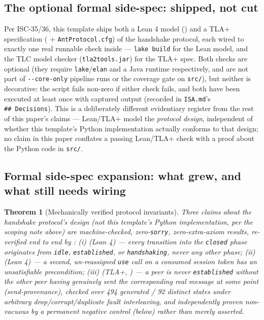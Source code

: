 \documentclass[
  english,
]{article}
\newtheorem{theorem}{Theorem}
\theoremstyle{definition}
\begin{document}
\subsection{The optional formal side-spec: shipped, not
cut}\label{the-optional-formal-side-spec-shipped-not-cut}

Per ISC-35/36, this template ships both a Lean 4 model
() and a TLA+ specification
( + \texttt{AntProtocol.cfg}) of the
handshake protocol, each wired to exactly one real runnable check inside
 --- \texttt{lake\ build} for
the Lean model, and the TLC model checker (\texttt{tla2tools.jar}) for
the TLA+ spec. Both checks are optional (they require
\texttt{lake}/\texttt{elan} and a Java runtime respectively, and are not
part of \texttt{-\/-core-only} pipeline runs or the coverage gate on
\texttt{src/}), but neither is decorative: the script fails non-zero if
either check fails, and both have been executed at least once with
captured output (recorded in \texttt{ISA.md}'s
\texttt{\#\#\ Decisions}). This is a deliberately different evidentiary
register from the rest of this paper's claims --- Lean/TLA+ model the
\emph{protocol design}, independent of whether this template's Python
implementation actually conforms to that design; no claim in this paper
conflates a passing Lean/TLA+ check with a proof about the Python code
in \texttt{src/}.

\subsection{Formal side-spec expansion: what grew, and what still needs
wiring}\label{formal-side-spec-expansion-what-grew-and-what-still-needs-wiring}

\begin{theorem}[Mechanically verified protocol invariants]
Three claims about the handshake protocol's \emph{design} (not this template's Python
implementation, per the scoping note above) are machine-checked, zero-\texttt{sorry}, zero-extra-axiom
results, re-verified end to end by : (i)
 (Lean 4) — every transition into the \texttt{closed} phase originates
from \texttt{idle}, \texttt{established}, or \texttt{handshaking}, never any other phase; (ii)
 (Lean 4) — a second, un-reassigned \texttt{use} call on a
consumed session token has an unsatisfiable precondition; (iii)  (TLA+,
) — a peer is never \texttt{established} without the other peer having
genuinely \emph{sent} the corresponding real message at some point (\emph{send-provenance}), checked
over 494 generated / 92 distinct states under arbitrary drop/corrupt/duplicate fault interleaving, and
independently proven non-vacuous by a permanent negative control (below) rather than merely asserted.
\end{theorem}
\end{document}

